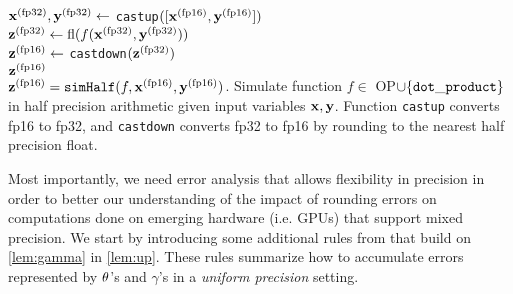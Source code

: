 \begin{algorithm2e}
	\DontPrintSemicolon %
	$\mathbf{x}^{(\text{fp32})}, \mathbf{y}^{(\text{fp32})} \gets$ {\tt castup}$([\mathbf{x}^{(\text{fp16})},\mathbf{y}^{(\text{fp16})}])$\\
	$\mathbf{z}^{(\text{fp32})} \gets \mathrm{fl}(f(\mathbf{x}^{(\text{fp32})}, \mathbf{y}^{(\text{fp32})}))$\\
	$\mathbf{z}^{(\text{fp16})} \gets$ {\tt castdown}$(\mathbf{z}^{(\text{fp32})})$\\
	\Return $\mathbf{z}^{(\text{fp16})}$\\
	\caption{$\mathbf{z}^{(\text{fp16})} = {\tt simHalf}(f, \mathbf{x}^{(\text{fp16})}, \mathbf{y}^{(\text{fp16})})$. Simulate function $f\in$ OP$\cup \{{\tt dot\_product} \}$ in half precision arithmetic given input variables $\mathbf{x},\mathbf{y}$. Function {\tt castup} converts fp16 to fp32, and {\tt castdown} converts fp32 to fp16 by rounding to the nearest half precision float.}
	\label{algo:simulate}
\end{algorithm2e}

Most importantly, we need error analysis that allows flexibility in precision in order to better our understanding of the impact of rounding errors on computations done on emerging hardware (i.e. GPUs) that support mixed precision. 
We start by introducing some additional rules from \cite{Higham2002} that build on \cref{lem:gamma} in \cref{lem:up}. 
These rules summarize how to accumulate errors represented by $\theta$'s and $\gamma$'s in a \emph{uniform precision} setting.

